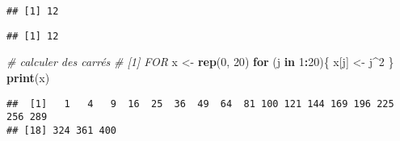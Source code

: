 \documentclass[]{book}
\newenvironment{Shaded}{\begin{snugshade}}{\end{snugshade}}
\newcommand{\KeywordTok}[1]{\textcolor[rgb]{0.13,0.29,0.53}{\textbf{#1}}}
\newcommand{\DataTypeTok}[1]{\textcolor[rgb]{0.13,0.29,0.53}{#1}}
\newcommand{\DecValTok}[1]{\textcolor[rgb]{0.00,0.00,0.81}{#1}}
\newcommand{\StringTok}[1]{\textcolor[rgb]{0.31,0.60,0.02}{#1}}
\newcommand{\CommentTok}[1]{\textcolor[rgb]{0.56,0.35,0.01}{\textit{#1}}}
\newcommand{\ControlFlowTok}[1]{\textcolor[rgb]{0.13,0.29,0.53}{\textbf{#1}}}
\newcommand{\OperatorTok}[1]{\textcolor[rgb]{0.81,0.36,0.00}{\textbf{#1}}}
\newcommand{\NormalTok}[1]{#1}
\theoremstyle{definition}
\theoremstyle{definition}
\theoremstyle{definition}
\theoremstyle{remark}
\begin{document}
\begin{Shaded}
\end{Shaded}

\begin{verbatim}
## [1] 12
\end{verbatim}

\begin{Shaded}
\end{Shaded}

\begin{verbatim}
## [1] 12
\end{verbatim}

\begin{Shaded}
\begin{Highlighting}[]
\CommentTok{# calculer des carrés}
\CommentTok{# [1] FOR}
\NormalTok{x <-}\StringTok{ }\KeywordTok{rep}\NormalTok{(}\DecValTok{0}\NormalTok{, }\DecValTok{20}\NormalTok{)}
\ControlFlowTok{for}\NormalTok{ (j }\ControlFlowTok{in} \DecValTok{1}\OperatorTok{:}\DecValTok{20}\NormalTok{)\{}
\NormalTok{  x[j] <-}\StringTok{ }\NormalTok{j}\OperatorTok{^}\DecValTok{2}
\NormalTok{\}}
\KeywordTok{print}\NormalTok{(x)}
\end{Highlighting}
\end{Shaded}

\begin{verbatim}
##  [1]   1   4   9  16  25  36  49  64  81 100 121 144 169 196 225 256 289
## [18] 324 361 400
\end{verbatim}
\end{document}
